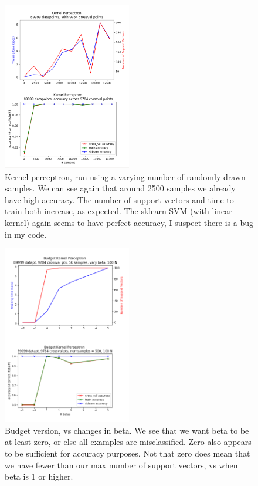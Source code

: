\documentclass[submit]{harvardml}
\newenvironment{answer}{%
    \color{answergreen}\bf}
  {%
  }
\begin{document}
\begin{enumerate}
\begin{answer}
            \begin{figure}[H]
                \centering
                \includegraphics[width=0.5\textwidth]{kernel_numsamples.png}
                \caption{Kernel perceptron, run using a varying number of randomly drawn samples. We
                can see again that around 2500 samples we already have high accuracy. The number of
                support vectors and time to train both increase, as expected. The sklearn
            SVM (with linear kernel) again seems to have perfect accuracy, I suspect there is a bug in my code.}
                \label{Problem 1, part 1.}
            \end{figure}

            \begin{figure}[H]
                \centering
                \includegraphics[width=0.5\textwidth]{budget_vs_beta.png}
                \caption{Budget version, vs changes in beta. We see that we want beta to be at least
                zero, or else all examples are misclassified. Zero also appears to be sufficient for
            accuracy purposes. Not that zero does mean that we have fewer than our max number of
        support vectors, vs when beta is 1 or higher.}
                \label{Problem 1, part 1.}
            \end{figure}


\end{answer}
\end{enumerate}
\end{document}
